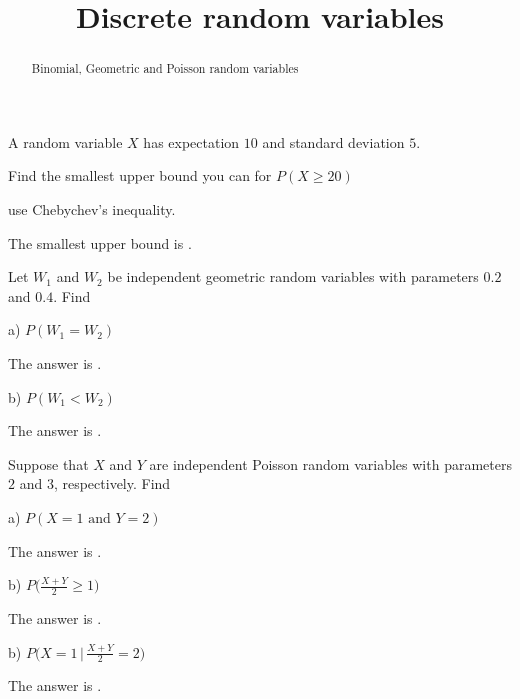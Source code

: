 \documentclass{ximera}
\title{Discrete random variables}
\begin{document}
\begin{abstract}
Binomial, Geometric and Poisson random variables
\end{abstract}
\maketitle

A random variable $X$ has expectation $10$ and standard deviation $5$.

\begin{question} 
Find the smallest upper bound you can for $P(X\geq 20)$
     \begin{hint}
          use Chebychev's inequality.
     \end{hint}
     \begin{solution}
          The smallest upper bound is .
     \end{solution}
\end{question}

Let $W_{1}$ and $W_{2}$ be independent geometric random variables with parameters $0.2$ and $0.4$. Find

\begin{question}
a) $P(W_{1}=W_{2})$
     \begin{solution}
          The answer is .
     \end{solution}
\end{question}

\begin{question}
b) $P(W_{1} < W_{2})$
     \begin{solution}
          The answer is .
     \end{solution}
\end{question}

Suppose that $X$ and $Y$ are independent Poisson random variables with parameters $2$ and $3$, respectively. Find

\begin{question}
a) $P(X=1 \text{ and } Y=2)$
     \begin{solution}
          The answer is .
     \end{solution}
\end{question}

\begin{question}
b) $P\bigg( \frac{X + Y}{2} \geq 1 \bigg)$
     \begin{solution}
          The answer is .
     \end{solution}
\end{question}

\begin{question}
b) $P\bigg( X=1 \,\bigg\vert\, \frac{X + Y}{2} = 2  \bigg)$
     \begin{solution}
          The answer is .
     \end{solution}
\end{question}
\end{document}
